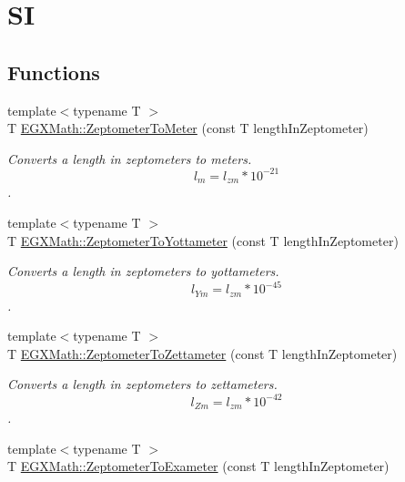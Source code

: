 \hypertarget{group___e_g_x_math-_conversions-_length_conversions-_s_i-_zeptometer-_s_i}{}\section{SI}
\label{group___e_g_x_math-_conversions-_length_conversions-_s_i-_zeptometer-_s_i}
\subsection*{Functions}
\begin{DoxyCompactItemize}
\item 
{\footnotesize template$<$typename T $>$ }\\T \mbox{\hyperlink{group___e_g_x_math-_conversions-_length_conversions-_s_i-_zeptometer-_s_i_gaf51d88eb55e387d6ee07a02f2229be97}{E\+G\+X\+Math\+::\+Zeptometer\+To\+Meter}} (const T length\+In\+Zeptometer)
\begin{DoxyCompactList}\small\item\em Converts a length in zeptometers to meters. \[ l_{m}=l_{zm} * 10^{-21} \]. \end{DoxyCompactList}\item 
{\footnotesize template$<$typename T $>$ }\\T \mbox{\hyperlink{group___e_g_x_math-_conversions-_length_conversions-_s_i-_zeptometer-_s_i_gaac70660b1e189b20afff8dcd02dfb105}{E\+G\+X\+Math\+::\+Zeptometer\+To\+Yottameter}} (const T length\+In\+Zeptometer)
\begin{DoxyCompactList}\small\item\em Converts a length in zeptometers to yottameters. \[ l_{Ym}=l_{zm} * 10^{-45} \]. \end{DoxyCompactList}\item 
{\footnotesize template$<$typename T $>$ }\\T \mbox{\hyperlink{group___e_g_x_math-_conversions-_length_conversions-_s_i-_zeptometer-_s_i_ga73c5c0469d7d2aa9947293128c7aed73}{E\+G\+X\+Math\+::\+Zeptometer\+To\+Zettameter}} (const T length\+In\+Zeptometer)
\begin{DoxyCompactList}\small\item\em Converts a length in zeptometers to zettameters. \[ l_{Zm}=l_{zm} * 10^{-42} \]. \end{DoxyCompactList}\item 
{\footnotesize template$<$typename T $>$ }\\T \mbox{\hyperlink{group___e_g_x_math-_conversions-_length_conversions-_s_i-_zeptometer-_s_i_ga28d70f8fb1a2876c4c8553348c78925d}{E\+G\+X\+Math\+::\+Zeptometer\+To\+Exameter}} (const T length\+In\+Zeptometer)

\end{DoxyCompactItemize}

